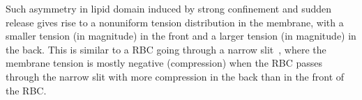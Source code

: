 \documentclass[twoside,twocolumn,9pt]{article}
\begin{document}
Such asymmetry in lipid domain induced by strong confinement and sudden
release gives rise to a nonuniform tension distribution in the membrane,
with a smaller tension (in magnitude) in the front and a larger tension
(in magnitude) in the back. This is similar to a RBC going through a
narrow slit~\cite{LuPeng2019_PoF}, where the membrane tension is mostly
negative (compression) when the RBC passes through the narrow slit with
more compression in the back than in the front of the RBC.


%
%
%
%
%
%
\end{document}
